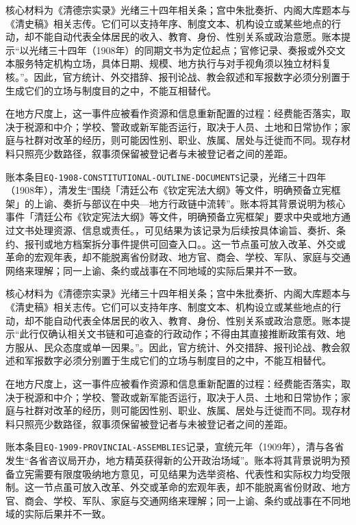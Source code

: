 核心材料为《清德宗实录》光绪三十四年相关条；宫中朱批奏折、内阁大库题本与《清史稿》相关志传。它们可以支持年序、制度文本、机构设立或某些地点的行动，却不能自动代表全体居民的收入、教育、身份、性别关系或政治意愿。账本提示“以光绪三十四年（1908年）的同期文书为定位起点；官修记录、奏报或外交文本服务特定机构立场，具体日期、规模、地方执行与对手视角须以独立材料复核。”。因此，官方统计、外交措辞、报刊论战、教会叙述和军报数字必须分别置于生成它们的立场与制度目的之中，不能互相替代。

在地方尺度上，这一事件应被看作资源和信息重新配置的过程：经费能否落实，取决于税源和中介；学校、警政或新军能否运行，取决于人员、土地和日常协作；家庭与社群对改革的经历，则可能因性别、职业、族属、居处与迁徙而不同。现存材料只照亮少数路径，叙事须保留被登记者与未被登记者之间的差距。

账本条目\texttt{EQ-1908-CONSTITUTIONAL-OUTLINE-DOCUMENTS}记录，光绪三十四年（1908年），清发生“围绕「清廷公布《钦定宪法大纲》等文件，明确预备立宪框架」的上谕、奏折与部议在中央—地方行政链中流转”。账本将其背景说明为核心事件「清廷公布《钦定宪法大纲》等文件，明确预备立宪框架」要求中央或地方通过文书处理资源、信息或责任。，可见结果为该记录为后续按具体谕旨、奏折、条约、报刊或地方档案拆分事件提供可回查入口。。这一节点虽可放入改革、外交或革命的宏观年表，却不能脱离省份财政、地方官、商会、学校、军队、家庭与交通网络来理解；同一上谕、条约或战事在不同地域的实际后果并不一致。

核心材料为《清德宗实录》光绪三十四年相关条；宫中朱批奏折、内阁大库题本与《清史稿》相关志传。它们可以支持年序、制度文本、机构设立或某些地点的行动，却不能自动代表全体居民的收入、教育、身份、性别关系或政治意愿。账本提示“此行仅确认相关文书链和可追查的行政动作；不得由其直接推断政策有效、地方服从、民众态度或单一因果。”。因此，官方统计、外交措辞、报刊论战、教会叙述和军报数字必须分别置于生成它们的立场与制度目的之中，不能互相替代。

在地方尺度上，这一事件应被看作资源和信息重新配置的过程：经费能否落实，取决于税源和中介；学校、警政或新军能否运行，取决于人员、土地和日常协作；家庭与社群对改革的经历，则可能因性别、职业、族属、居处与迁徙而不同。现存材料只照亮少数路径，叙事须保留被登记者与未被登记者之间的差距。

账本条目\texttt{EQ-1909-PROVINCIAL-ASSEMBLIES}记录，宣统元年（1909年），清与各省发生“各省咨议局开办，地方精英获得新的公开政治场域”。账本将其背景说明为预备立宪需要有限度吸纳地方意见，可见结果为选举资格、代表性和实际权力均受限制。这一节点虽可放入改革、外交或革命的宏观年表，却不能脱离省份财政、地方官、商会、学校、军队、家庭与交通网络来理解；同一上谕、条约或战事在不同地域的实际后果并不一致。

